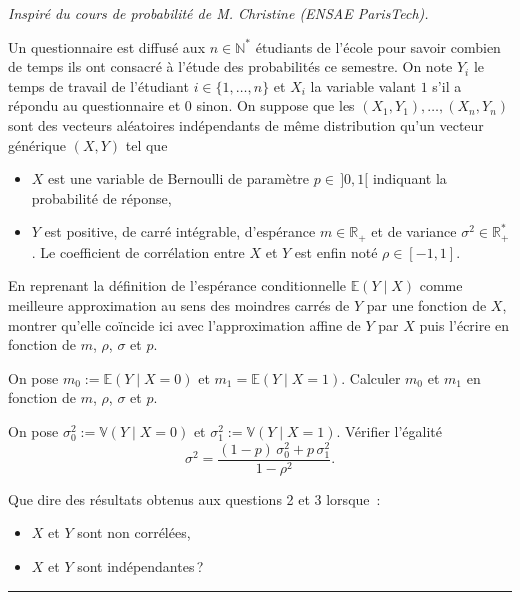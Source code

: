 \emph{Inspiré du cours de probabilité de M. Christine (ENSAE
ParisTech).}

Un questionnaire est diffusé aux \(n\in\mathbb{N}^\ast\) étudiants de
l'école pour savoir combien de temps ils ont consacré à l'étude des
probabilités ce semestre. On note \(Y_i\) le temps de travail de
l'étudiant \(i \in \{1,\dots,n\}\) et \(X_i\) la variable valant \(1\)
s'il a répondu au questionnaire et \(0\) sinon. On suppose que les
\((X_1,Y_1),\dots,(X_n,Y_n)\) sont des vecteurs aléatoires indépendants
de même distribution qu'un vecteur générique \((X,Y)\) tel que

\begin{itemize}
\tightlist
\item
  \(X\) est une variable de Bernoulli de paramètre \(p\in\,]0,1[\)
  indiquant la probabilité de réponse,
\item
  \(Y\) est positive, de carré intégrable, d'espérance
  \(m\in\mathbb{R}_+\) et de variance \(\sigma^2 \in\mathbb{R}_+^\ast\).
  Le coefficient de corrélation entre \(X\) et \(Y\) est enfin noté
  \(\rho \in [-1,1]\).
\end{itemize}

\label{III-nonrep1}
En reprenant la définition de l'espérance conditionnelle
\(\mathbb{E}(Y\mid X)\) comme meilleure approximation au sens des
moindres carrés de \(Y\) par une fonction de \(X\), montrer qu'elle
coïncide ici avec l'approximation affine de \(Y\) par \(X\) puis
l'écrire en fonction de \(m\), \(\rho\), \(\sigma\) et
\(p\).

\label{III-nonrep2}
On pose \(m_0 := \mathbb{E}(Y\mid X = 0)\) et
\(m_1 = \mathbb{E}(Y\mid X = 1)\). Calculer \(m_0\) et \(m_1\) en
fonction de \(m\), \(\rho\), \(\sigma\) et
\(p\).

\label{III-nonrep3}
On pose \(\sigma^2_0 := \mathbb{V}\left(Y\mid X = 0\right)\) et
\(\sigma^2_1 := \mathbb{V}\left(Y\mid X = 1\right)\). Vérifier l'égalité
\[\sigma^2 = \dfrac{(1-p)\,\sigma^2_0 + p\,\sigma^2_1}{1-\rho^2}.\]


\label{III-nonrep4}
Que dire des résultats obtenus aux questions 2 et 3 lorsque~:

\begin{itemize}
\tightlist
\item
  \(X\) et \(Y\) sont non corrélées,
\item
  \(X\) et \(Y\) sont indépendantes\,?
\end{itemize}

\begin{center}\rule{0.5\linewidth}{0.5pt}\end{center}

